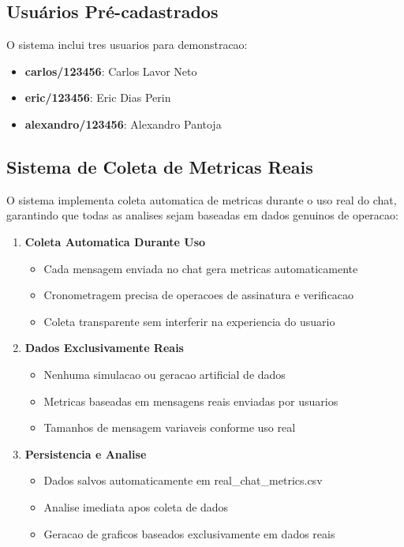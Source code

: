 \documentclass[12pt,a4paper,oneside]{article}
\begin{document}
\subsection{Usuários Pré-cadastrados}

O sistema inclui tres usuarios para demonstracao:

\begin{itemize}
    \item \textbf{carlos/123456}: Carlos Lavor Neto
    \item \textbf{eric/123456}: Eric Dias Perin
    \item \textbf{alexandro/123456}: Alexandro Pantoja
\end{itemize}

\subsection{Sistema de Coleta de Metricas Reais}

O sistema implementa coleta automatica de metricas durante o uso real do chat, garantindo que todas as analises sejam baseadas em dados genuinos de operacao:

\begin{enumerate}
    \item \textbf{Coleta Automatica Durante Uso}
    \begin{itemize}
        \item Cada mensagem enviada no chat gera metricas automaticamente
        \item Cronometragem precisa de operacoes de assinatura e verificacao
        \item Coleta transparente sem interferir na experiencia do usuario
    \end{itemize}
    
    \item \textbf{Dados Exclusivamente Reais}
    \begin{itemize}
        \item Nenhuma simulacao ou geracao artificial de dados
        \item Metricas baseadas em mensagens reais enviadas por usuarios
        \item Tamanhos de mensagem variaveis conforme uso real
    \end{itemize}
    
    \item \textbf{Persistencia e Analise}
    \begin{itemize}
        \item Dados salvos automaticamente em real\_chat\_metrics.csv
        \item Analise imediata apos coleta de dados
        \item Geracao de graficos baseados exclusivamente em dados reais
    \end{itemize}
\end{enumerate}
\end{document}
